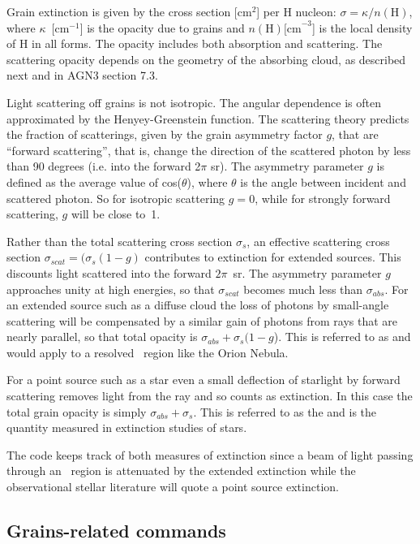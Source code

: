 Grain extinction is given by the cross section [cm$^2$] per H nucleon:
$\sigma  = \kappa /n( {\mathrm{H}} )$,
where $\kappa$~[cm$^{-1}$] is the opacity due
to grains and $n(\mathrm{H}) \mathrm{[cm}^{-3}$] is the
local density of H in all forms.
The opacity includes both absorption and
scattering.
The scattering opacity depends on the geometry of the absorbing
cloud, as described next and in AGN3 section 7.3.

Light scattering off grains is not isotropic.
The angular dependence
is often approximated by the Henyey-Greenstein function.
The scattering
theory predicts the fraction of scatterings,
given by the grain asymmetry
factor $g$, that are ``forward scattering'', that is,
change the direction
of the scattered photon by less than 90 degrees
(i.e. into the forward 2$\pi$ sr).
The asymmetry parameter $g$ is defined as the average value of
cos($\theta$), where $\theta$ is the angle between incident
and scattered photon.
So for isotropic scattering $g = 0$,
while for strongly forward scattering, $g$ will be close to~1.

Rather than the total scattering cross section $\sigma_s$,
an effective scattering
cross section $\sigma_{scat} = (\sigma_s (1-g)$
contributes to extinction for extended sources.
This discounts light scattered into the forward $2\pi$~sr.
The asymmetry parameter $g$ approaches unity at high energies,
so that $\sigma_{scat}$
becomes much less than $\sigma_{abs}$.
For an extended source such as a diffuse cloud
the loss of photons by small-angle scattering will be compensated
by a
similar gain of photons from rays that are nearly parallel,
so that total
opacity is $\sigma_{abs} + \sigma_s(1-g$).
This is referred to as 
and would apply to a resolved \hii\ region like the Orion Nebula.

For a point source such as a star even a small deflection of
starlight by forward scattering removes light from the ray
and so counts as extinction.
In this case the total grain opacity is simply
$\sigma_{abs} + \sigma_s$.
This is referred
to as the  and is the quantity
measured in extinction studies of stars.

The code keeps track of both measures of extinction since a beam of light
passing through an \hii\ region is attenuated by the extended extinction
while the observational stellar literature will quote a point source
extinction.

\subsection{Grains-related commands}

